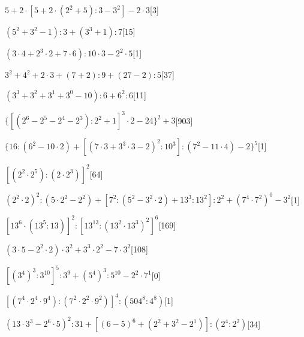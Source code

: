 \begin{esercizio} \label{ese:1.17}
$5+2\cdot[5+2\cdot(2^2+5):3-3^2]-2\cdot3$\hfill[3]
\end{esercizio}
\begin{esercizio} \label{ese:1.17}
$(5^2+3^2-1):3+(3^3+1):7$\hfill[15]
\end{esercizio}
\begin{esercizio} \label{ese:1.17}
$(3\cdot4+2^3\cdot2+7\cdot6):10\cdot3-2^2\cdot5$\hfill[1]
\end{esercizio}
\begin{esercizio} \label{ese:1.17}
$3^2+4^2+2\cdot3+(7+2):9+(27-2):5$\hfill[37]
\end{esercizio}
\begin{esercizio} \label{ese:1.17}
$(3^3+3^2+3^1+3^0-10):6+6^2:6$\hfill[11]
\end{esercizio}
\begin{esercizio} \label{ese:1.17}
$\{[(2^6-2^5-2^4-2^3):2^2+1]^3\cdot2-24\}^2+3$\hfill[903]
\end{esercizio}
\begin{esercizio} \label{ese:1.17}
$\{16:(6^2-10\cdot2)+[(7\cdot3+3^3\cdot3-2)^2:10^3]:(7^2-11\cdot4)-2\}^5$\hfill[1]
\end{esercizio}
\begin{esercizio} \label{ese:1.17}
$[(2^2\cdot2^5):(2\cdot2^3)]^2$\hfill[64]
\end{esercizio}
\begin{esercizio} \label{ese:1.17}
$(2^2\cdot2)^2:(5\cdot2^2-2^2)+[7^2:(5^2-3^2\cdot2)+13^3:13^2]:2^2+(7^4\cdot7^2)^0-3^2$\hfill[1]
\end{esercizio}
\begin{esercizio} \label{ese:1.17}
$[13^6\cdot(13^5:13)]^2:[13^{13}:(13^2\cdot13^3)^2]^6$\hfill[169]
\end{esercizio}
\begin{esercizio} \label{ese:1.17}
$(3\cdot5-2^2\cdot2)\cdot3^2+3^3\cdot2^2-7\cdot3^2$\hfill[108]
\end{esercizio}
\begin{esercizio} \label{ese:1.17}
$[(3^4)^3:3^{10}]^5:3^9+(5^4)^3:5^{10}-2^2\cdot7^1$\hfill[0]
\end{esercizio}
\begin{esercizio} \label{ese:1.17}
$[(7^4\cdot2^4\cdot9^4):(7^2\cdot2^2\cdot9^2)]^4:(504^8:4^8)$\hfill[1]
\end{esercizio}
\begin{esercizio} \label{ese:1.17}
$(13\cdot3^3-2^6\cdot5)^2:31+[(6-5)^6+(2^2+3^2-2^1)]:(2^4:2^2)$\hfill[34]
\end{esercizio}
